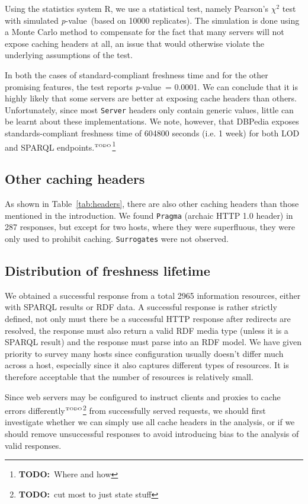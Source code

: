 \documentclass{llncs}
\newcommand{\pvalue}{\textit{p}-value\ }
\newcommand{\httph}[1]{\texttt{#1}}
\newcommand{\todo}[1]{\ensuremath{^{\textrm{\tiny{TODO}\normalsize}}}\footnote{\textbf{TODO:}~#1}}
\begin{document}
Using the statistics system R\cite{kn:r}, we use a statistical test,
namely Pearson's $\chi^2$ test with simulated \pvalue (based on 10000
replicates). The simulation is done using a Monte Carlo method to
compensate for the fact that many servers will not expose caching
headers at all, an issue that would otherwise violate the underlying
assumptions of the test.

In both the cases of standard-compliant freshness time and for the
other promising features, the test reports \pvalue = 0.0001. We can
conclude that it is highly likely that some servers are better at
exposing cache headers than others. Unfortunately, since most
\httph{Server} headers only contain generic values, little can be
learnt about these implementations. We note, however, that DBPedia
exposes standards-compliant freshness time of 604800 seconds (i.e. 1
week) for both LOD and SPARQL endpoints.\todo{Where and how}

\subsection{Other caching headers}

As shown in Table~\ref{tab:headers}, there are also other caching
headers than those mentioned in the introduction. We found
\httph{Pragma} (archaic HTTP 1.0 header) in 287 responses, but except
for two hosts, where they were superfluous, they were only used to
prohibit caching. \httph{Surrogates} were not observed.

\subsection{Distribution of freshness lifetime}

We obtained a successful response from a total 2965 information
resources, either with SPARQL results or RDF data. A successful
response is rather strictly defined, not only must there be a
successful HTTP response after redirects are resolved, the response
must also return a valid RDF media type (unless it is a SPARQL result)
and the response must parse into an RDF model. We have given priority
to survey many hosts since configuration usually doesn't differ much
across a host, especially since it also captures different types of
resources. It is therefore acceptable that the number of resources is
relatively small.

Since web servers may be configured to instruct clients and proxies to
cache errors differently\todo{cut most to just state stuff} from
successfully served requests, we should first investigate whether we
can simply use all cache headers in the analysis, or if we should
remove unsuccessful responses to avoid introducing bias to the
analysis of valid responses.
\end{document}

